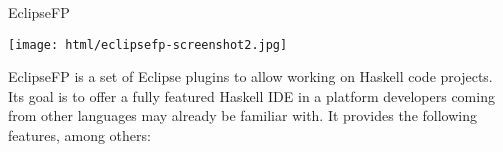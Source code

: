 \begin{hcarentry}[updated]{EclipseFP}
\makeheader

\begin{center}
\texttt{[image: html/eclipsefp-screenshot2.jpg]}
\end{center}

EclipseFP is a set of Eclipse plugins to allow working on Haskell code
projects. Its goal is to offer a fully featured Haskell IDE in a platform
developers coming from other languages may already be familiar with. It
provides the following features, among others:


\end{hcarentry}
